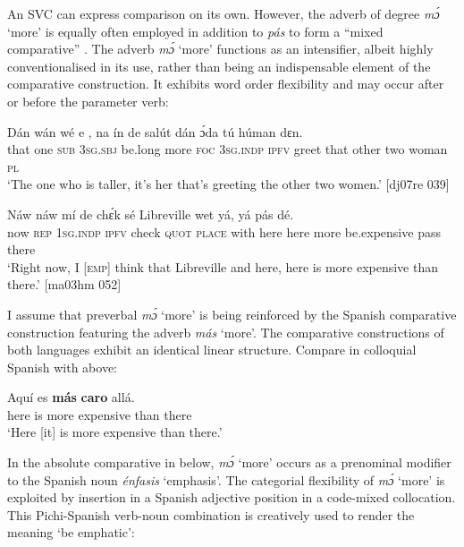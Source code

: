 An SVC can express comparison  on its own. However, the adverb of degree \textit{mɔ́} ‘more’ is equally often employed in addition to \textit{pás} to form a “mixed comparative” \citep{Stassen1985}. The adverb \textit{mɔ́} ‘more’ functions as an intensifier, albeit highly conventionalised in its use, rather than being an indispensable element of the comparative construction. It exhibits word order flexibility and may occur after  or before  the parameter verb:


\ea%
    \label{ex:key:471}
    \gll Dán  wán  wé  e        ,    na  ín
de  salút  dán  ɔ́da    tú  húman  dɛn.\\
that  one  \textsc{sub}  \textsc{3sg.sbj}  be.long  more  \textsc{foc}  \textsc{3sg.indp}
\textsc{ipfv}  greet  that  other  two  woman  \textsc{pl}\\

\glt ‘The one who is taller, it’s her that’s greeting the other two
women.’ [dj07re 039]
\z


\ea%
    \label{ex:key:472}
    \gll Náw    náw    mí    de  chɛ́k  sé    Libreville  wet    yá,
yá              pás  dé.\\
now    \textsc{rep}    \textsc{1sg.indp}  \textsc{ipfv}  check  \textsc{quot}    \textsc{place}    with    here
here    more  be.expensive  pass  there\\

\glt ‘Right now, I [\textsc{emp}] think that Libreville and here, here is more expensive
than there.’ [ma03hm 052]
\z

I assume that preverbal \textit{mɔ́} ‘more’ is being reinforced by the Spanish comparative construction featuring the adverb \textit{más} ‘more’. The comparative constructions of both languages exhibit an identical linear structure. Compare  in colloquial Spanish with  above:


\ea%
    \label{ex:key:473}
    \gll Aquí  es     \textbf{más}    \textbf{caro}          allá.\\
here    is    more  expensive  than  there\\

\glt ‘Here [it] is more expensive than there.’
\z

In the absolute comparative in  below, \textit{mɔ́} ‘more’ occurs as a prenominal modifier to the Spanish noun \textit{énfasis} ‘emphasis’. The categorial flexibility of \textit{mɔ́} ‘more’ is exploited by insertion in a Spanish adjective position in a code-mixed collocation. This Pichi-Spanish verb-noun combination is creatively used to render the meaning ‘be emphatic’:


